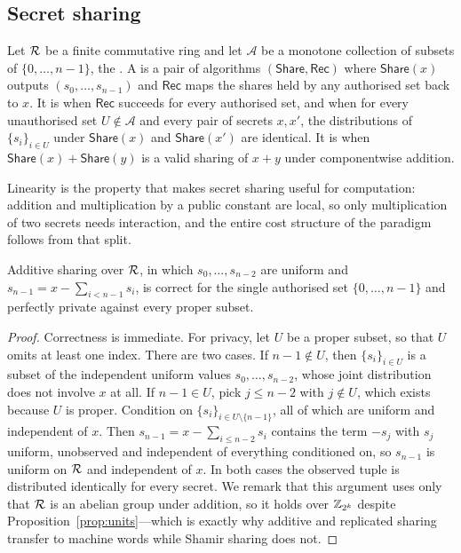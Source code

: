 \subsection{Secret sharing}
\label{sec:found:ss}

\begin{definition}
\label{def:ss}
Let $\mathcal{R}$ be a finite commutative ring and let $\mathcal{A}$ be a monotone
collection of subsets of $\{0,\dots,n-1\}$, the . A
 is a pair of algorithms $(\mathsf{Share},
\mathsf{Rec})$ where $\mathsf{Share}(x)$ outputs $(s_0,\dots,s_{n-1})$ and
$\mathsf{Rec}$ maps the shares held by any authorised set back to $x$. It is
 when $\mathsf{Rec}$ succeeds for every authorised set, and
 when for every unauthorised set $U \notin \mathcal{A}$ and
every pair of secrets $x,x'$, the distributions of $\{s_i\}_{i \in U}$ under
$\mathsf{Share}(x)$ and $\mathsf{Share}(x')$ are identical. It is 
when $\mathsf{Share}(x)+\mathsf{Share}(y)$ is a valid sharing of $x+y$ under
componentwise addition.
\end{definition}

Linearity is the property that makes secret sharing useful for computation:
addition and multiplication by a public constant are local, so only multiplication
of two secrets needs interaction, and the entire cost structure of the paradigm
follows from that split.

\begin{proposition}
\label{prop:additive-priv}
Additive sharing over $\mathcal{R}$, in which $s_0,\dots,s_{n-2}$ are uniform and
$s_{n-1} = x - \sum_{i<n-1} s_i$, is correct for the single authorised set
$\{0,\dots,n-1\}$ and perfectly private against every proper subset.
\end{proposition}

\begin{proof}
Correctness is immediate. For privacy, let $U$ be a proper subset, so that
$U$ omits at least one index. There are two cases. If $n-1 \notin U$, then
$\{s_i\}_{i \in U}$ is a subset of the independent uniform values
$s_0,\dots,s_{n-2}$, whose joint distribution does not involve $x$ at all. If
$n-1 \in U$, pick $j \le n-2$ with $j \notin U$, which exists because $U$ is
proper. Condition on $\{s_i\}_{i \in U \setminus \{n-1\}}$, all of which are
uniform and independent of $x$. Then
$s_{n-1} = x - \sum_{i \le n-2} s_i$ contains the term $-s_j$ with $s_j$ uniform,
unobserved and independent of everything conditioned on, so $s_{n-1}$ is uniform
on $\mathcal{R}$ and independent of $x$. In both cases the observed tuple is
distributed identically for every secret. We remark that this argument uses only
that $\mathcal{R}$ is an abelian group under addition, so it holds over $\mathbb{Z}_{2^k}$
despite Proposition~\ref{prop:units}---which is exactly why additive and
replicated sharing transfer to machine words while Shamir sharing does not.
\end{proof}

